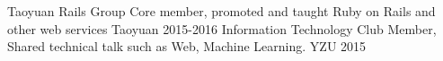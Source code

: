 \begin{cvhonors}
  \cvhonor
    {Taoyuan Rails Group}
    {Core member, promoted and taught Ruby on Rails and other web services}
    {Taoyuan}
    {2015-2016}
  \cvhonor
    {Information Technology Club}
    {Member, Shared technical talk such as Web, Machine Learning.}
    {YZU}
    {2015}
\end{cvhonors}

